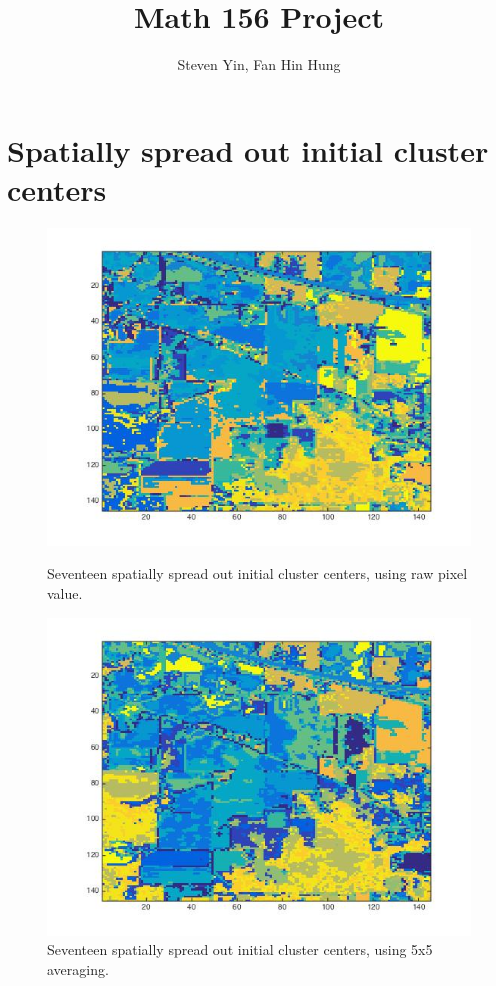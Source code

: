 \documentclass[11pt]{article}
\begin{document}
\title{Math 156 Project}
\author{Steven Yin, Fan Hin Hung}
\maketitle
{}
\maketitle



\section*{Spatially spread out initial cluster centers}

\begin{figure}[h!]
\begin{minipage}{.5\textwidth}
  \includegraphics[scale=0.45]{init_noavg.jpg}
  \caption{Seventeen spatially spread out initial cluster centers, using raw pixel value.}
  \label{fig:3}
\end{minipage}%
\begin{minipage}{.5\textwidth}
  \includegraphics[scale=0.45]{init_avg.jpg}
  \caption{Seventeen spatially spread out initial cluster centers, using 5x5 averaging.}
  \label{fig:3}
\end{minipage}
\end{figure}
\end{document}
